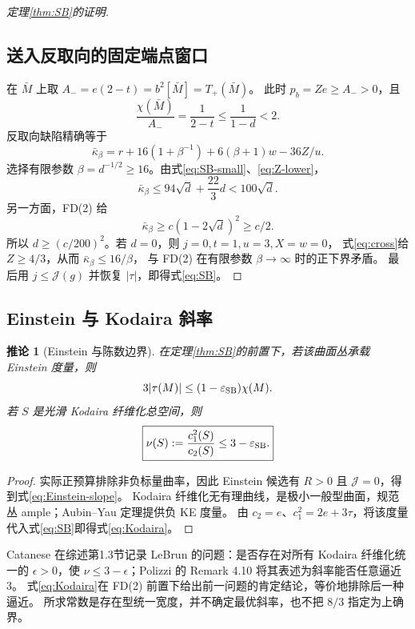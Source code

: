 \documentclass[UTF8,11pt,a4paper,fontset=none]{ctexart}
\numberwithin{equation}{section}
\newtheorem{corollary}[theorem]{推论}
\theoremstyle{definition}
\theoremstyle{remark}\newtheorem{remark}[theorem]{说明}
\newcommand{\Jcal}{\mathcal J}
\begin{document}
\begin{proof}[定理\ref{thm:SB}的证明]
\subsection*{送入反取向的固定端点窗口}
在 $\bar M$ 上取 $A_-=e(2-t)=b^2[\bar M]=T_+(\bar M)$。
此时 $p_b=Ze\ge A_->0$，且
\[
\frac{\chi(\bar M)}{A_-}=\frac1{2-t}\le\frac1{1-d}<2.
\]
反取向缺陷精确等于
\[
\bar\kappa_\beta
=r+16(1+\beta^{-1})+6(\beta+1)w-36Z/u.
\]
选择有限参数 $\beta=d^{-1/2}\ge16$。由式\eqref{eq:SB-small}、\eqref{eq:Z-lower}，
\[
\bar\kappa_\beta\le94\sqrt d+\frac{22}{3}d<100\sqrt d.
\]
另一方面，FD(2) 给
\[
\bar\kappa_\beta\ge c(1-2\sqrt d)^2\ge c/2.
\]
所以 $d\ge(c/200)^2$。若 $d=0$，则 $j=0,t=1,u=3,X=w=0$，
式\eqref{eq:cross}给 $Z\ge4/3$，从而 $\bar\kappa_\beta\le16/\beta$，
与 FD(2) 在有限参数 $\beta\to\infty$ 时的正下界矛盾。
最后用 $j\le\Jcal(g)$ 并恢复 $|\tau|$，即得式\eqref{eq:SB}。
\end{proof}

\subsection{Einstein 与 Kodaira 斜率}
\begin{corollary}[Einstein 与陈数边界]\label{cor:slope}
在定理\ref{thm:SB}的前置下，若该曲面丛承载 Einstein 度量，则
\begin{equation}\label{eq:Einstein-slope}
3|\tau(M)|\le(1-\varepsilon_{\rm SB})\chi(M).
\end{equation}
若 $S$ 是光滑 Kodaira 纤维化总空间，则
\begin{equation}\label{eq:Kodaira}
\boxed{\nu(S):=\frac{c_1^2(S)}{c_2(S)}\le3-\varepsilon_{\rm SB}.}
\end{equation}
\end{corollary}
\begin{proof}
实际正预算排除非负标量曲率，因此 Einstein 候选有 $R>0$ 且 $\Jcal=0$，得到式\eqref{eq:Einstein-slope}。
Kodaira 纤维化无有理曲线，是极小一般型曲面，规范丛 ample；Aubin--Yau 定理提供负 KE 度量。
由 $c_2=e$、$c_1^2=2e+3\tau$，将该度量代入式\eqref{eq:SB}即得式\eqref{eq:Kodaira}\cite{LeBrunKodaira,Catanese2016}。
\end{proof}

Catanese 在综述第1.3节记录 LeBrun 的问题：是否存在对所有 Kodaira 纤维化统一的
$\epsilon>0$，使 $\nu\le3-\epsilon$；Polizzi 的 Remark 4.10 将其表述为斜率能否任意逼近 $3$\cite{Catanese2016,Polizzi2022}。
式\eqref{eq:Kodaira}在 FD(2) 前置下给出前一问题的肯定结论，等价地排除后一种逼近。
所求常数是存在型统一宽度，并不确定最优斜率，也不把 $8/3$ 指定为上确界。
\end{document}
